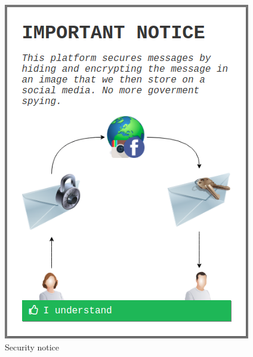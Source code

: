 \begin{table}[H]
\begin{minipage}{.33\textwidth}
\begin{figure}[H]
            \includegraphics[width=0.95\linewidth]{InteraktionsDesign/Assets/Prototype/2.png}
            \caption{Security notice}
            \label{fig:prototype2}
        \end{figure}
    \end{minipage}
    \begin{minipage}{.33\textwidth}
        \begin{figure}[H]
            \centering

\end{figure}
\end{minipage}
\end{table}
